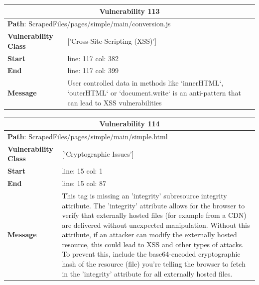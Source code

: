 \documentclass[12pt]{article}
\begin{document}
\vspace{0.7cm}
\FloatBarrier
\begin{table}[!h]
\centering
\renewcommand{\arraystretch}{1.3}
\begin{tabular}{|l|p{10cm}|}
\hline
\multicolumn{2}{|c|}{\textbf{Vulnerability 113}} \\
\hline
\multicolumn{2}{|l|}{\textbf{Path}: ScrapedFiles/pages/simple/main/conversion.js} \\
\hline
\textbf{Vulnerability Class} & ['Cross-Site-Scripting (XSS)'] \\
\hline
\textbf{Start} & line: 117 \quad col: 382 \\
\hline
\textbf{End} & line: 117 \quad col: 399 \\
\hline
\textbf{Message} & User controlled data in methods like `innerHTML`, `outerHTML` or `document.write` is an anti-pattern that can lead to XSS vulnerabilities \\
\hline
\end{tabular}
\end{table}
\vspace{0.7cm}
\FloatBarrier
\begin{table}[!h]
\centering
\renewcommand{\arraystretch}{1.3}
\begin{tabular}{|l|p{10cm}|}
\hline
\multicolumn{2}{|c|}{\textbf{Vulnerability 114}} \\
\hline
\multicolumn{2}{|l|}{\textbf{Path}: ScrapedFiles/pages/simple/main/simple.html} \\
\hline
\textbf{Vulnerability Class} & ['Cryptographic Issues'] \\
\hline
\textbf{Start} & line: 15 \quad col: 1 \\
\hline
\textbf{End} & line: 15 \quad col: 87 \\
\hline
\textbf{Message} & This tag is missing an 'integrity' subresource integrity attribute. The 'integrity' attribute allows for the browser to verify that externally hosted files (for example from a CDN) are delivered without unexpected manipulation. Without this attribute, if an attacker can modify the externally hosted resource, this could lead to XSS and other types of attacks. To prevent this, include the base64-encoded cryptographic hash of the resource (file) you're telling the browser to fetch in the 'integrity' attribute for all externally hosted files. \\
\hline
\end{tabular}
\end{table}
\vspace{0.7cm}
\end{document}
